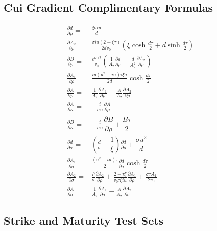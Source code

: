 \documentclass[12,twoside]{mammeTFM}
\theoremstyle{definition}
\theoremstyle{remark}
\begin{document}
\subsection{Cui Gradient Complimentary Formulas} \label{app:cui_extra}

\begin{align}
\frac{\partial d}{\partial \rho}=&\frac{\xi \sigma i u}{d} \\
\frac{\partial A_{2}}{\partial \rho}=&\frac{\sigma i u(2+\xi \tau)}{2 d v_{0}}\left(\xi \cosh \frac{d \tau}{2}+d \sinh \frac{d \tau}{2}\right) \\
\frac{\partial B}{\partial \rho}=&\frac{e^{\kappa \tau / 2}}{v_{0}}\left(\frac{1}{A_{2}} \frac{\partial d}{\partial \rho}-\frac{d}{A_{2}^{2}} \frac{\partial A_{2}}{\partial \rho}\right) \\
\frac{\partial A_{1}}{\partial \rho}=&\frac{i u\left(u^{2}-i u\right) \tau \xi \sigma}{2 d} \cosh \frac{d \tau}{2} \\
\frac{\partial A}{\partial \rho}=&\frac{1}{A_{2}} \frac{\partial A_{1}}{\partial \rho}-\frac{A}{A_{2}} \frac{\partial A_{2}}{\partial \rho}\\
\frac{\partial A}{\partial \kappa}=&-\frac{i}{\sigma u} \frac{\partial A}{\partial \rho}\\
\frac{\partial B}{\partial \kappa}=&-\frac{i}{\sigma u}\dfrac{\partial B}{\partial \rho} + \dfrac{B \tau}{2}\\
\frac{\partial d}{\partial \sigma}=& \left( \frac{d}{\sigma} - \dfrac{1}{\xi} \right) \frac{\partial d}{\partial \rho} + \dfrac{\sigma u^2}{d}\\
\frac{\partial A_{1}}{\partial \sigma}=&\frac{\left(u^{2}-i u\right) \tau}{2} \frac{\partial d}{\partial \sigma} \cosh \frac{d \tau}{2} \\
\frac{\partial A_{2}}{\partial \sigma}=&\frac{\rho}{\sigma} \frac{\partial A_{2}}{\partial \rho}+\frac{2+\tau \xi}{v_{0} \tau \xi i u} \frac{\partial A_{1}}{\partial \rho}+\frac{\sigma \tau A_{1}}{2 v_{0}} \\
\frac{\partial A}{\partial \sigma}=&\frac{1}{A_{2}} \frac{\partial A_{1}}{\partial \sigma}-\frac{A}{A_{2}} \frac{\partial A_{2}}{\partial \sigma}
\end{align}

\subsection{Strike and Maturity Test Sets}\label{app:strikes}
\end{document}
